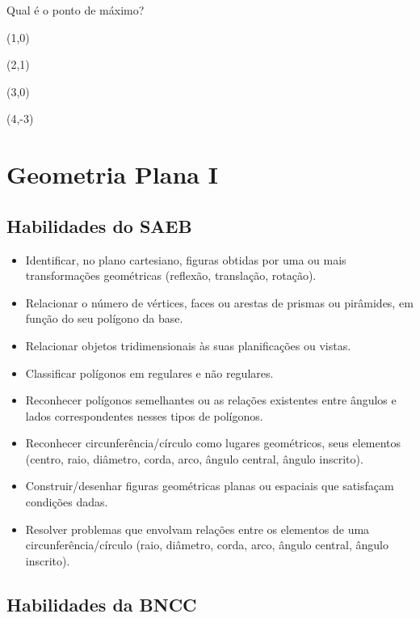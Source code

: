 \begin{escolha}
\begin{escolha}
Qual é o ponto de máximo?

\begin{escolha}

\item (1,0)

\item (2,1)

\item (3,0)

\item (4,-3)

\end{escolha}

\chapter{Geometria Plana I}

\section{Habilidades do SAEB}

\begin{itemize}
  \item Identificar, no plano cartesiano, figuras obtidas por uma ou mais
transformações geométricas (reflexão, translação, rotação).
  \item Relacionar o número de vértices, faces ou arestas de prismas ou
pirâmides, em função do seu polígono da base.
  \item Relacionar objetos tridimensionais às suas planificações ou vistas.
  \item Classificar polígonos em regulares e não regulares.
  \item Reconhecer polígonos semelhantes ou as relações existentes entre
ângulos e lados correspondentes nesses tipos de polígonos.
  \item Reconhecer circunferência/círculo como lugares geométricos, seus
elementos (centro, raio, diâmetro, corda, arco, ângulo central, ângulo
inscrito).
  \item Construir/desenhar figuras geométricas planas ou espaciais que
satisfaçam condições dadas.
  \item Resolver problemas que envolvam relações entre os elementos de uma
circunferência/círculo (raio, diâmetro, corda, arco, ângulo central, ângulo
inscrito).
\end{itemize} 

\section{Habilidades da BNCC}


\end{escolha}
\end{escolha}
